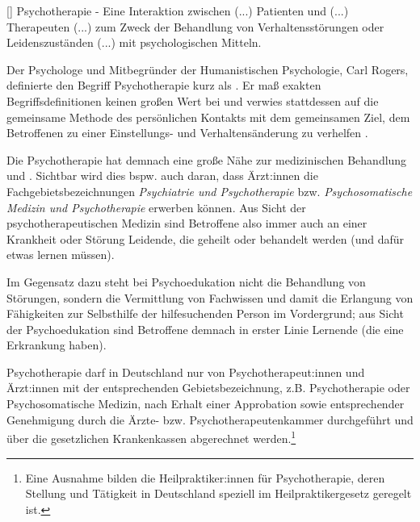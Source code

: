\documentclass[
  twoside,
  parskip=half-,
  paper=176mm:246mm,
  BCOR=14mm,
  DIV=14,
]{scrreprt}
\makeatletter
\renewenvironment*{displayquote}
  {\begingroup\setlength{\leftmargini}{0pt}\csq@getcargs{\csq@bdquote{}{}}}
  {\csq@edquote\endgroup}
\makeatother
\begin{document}
\begin{displayquote}[{\cite[891]{integrativePsycho}}]
  Psychotherapie - Eine Interaktion zwischen (...) Patienten und (...) Therapeuten (...) zum Zweck der Behandlung von Verhaltensstörungen oder Leidenszuständen (...) mit psychologischen Mitteln.
\end{displayquote}

Der Psychologe und Mitbegründer der Humanistischen Psychologie, Carl Rogers, definierte den Begriff Psychotherapie kurz als . Er maß exakten Begriffsdefinitionen keinen großen Wert bei und verwies stattdessen auf die gemeinsame Methode des persönlichen Kontakts mit dem gemeinsamen Ziel, dem Betroffenen zu einer Einstellungs- und Verhaltensänderung zu verhelfen \autocite[vgl.][17]{rogers1942}.

Die Psychotherapie hat demnach eine große Nähe zur medizinischen Behandlung und . Sichtbar wird dies bspw. auch daran, dass Ärzt:innen die Fachgebietsbezeichnungen \textit{Psychiatrie und Psychotherapie} bzw. \textit{Psychosomatische Medizin und Psychotherapie} erwerben können. Aus Sicht der psychotherapeutischen Medizin sind Betroffene also immer auch an einer Krankheit oder Störung Leidende, die geheilt oder behandelt werden (und dafür etwas lernen müssen). 

Im Gegensatz dazu steht bei Psychoedukation nicht die Behandlung von Störungen, sondern die Vermittlung von Fachwissen und damit die Erlangung von Fähigkeiten zur Selbsthilfe der hilfesuchenden Person im Vordergrund; aus Sicht der Psychoedukation sind Betroffene demnach in erster Linie Lernende (die eine Erkrankung haben). 

Psychotherapie darf in Deutschland nur von Psychotherapeut:innen und Ärzt:innen mit der entsprechenden Gebietsbezeichnung, z.B. Psychotherapie oder Psychosomatische Medizin, nach Erhalt einer Approbation sowie entsprechender Genehmigung durch die Ärzte- bzw. Psychotherapeutenkammer durchgeführt und über die gesetzlichen Krankenkassen abgerechnet werden.\footnote{Eine Ausnahme bilden die Heilpraktiker:innen für Psychotherapie, deren Stellung und Tätigkeit in Deutschland speziell im Heilpraktikergesetz geregelt ist.} 
\end{document}
